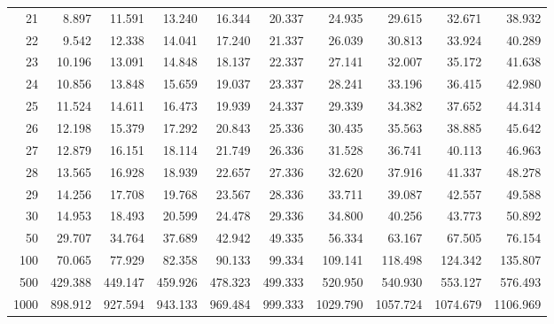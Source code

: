 \begin{minipage}{18cm}
\begin{center}
\begin{tabular}{|r|rrr|rrr|rrr|}
21&8.897&11.591&13.240&16.344&20.337&24.935&29.615&32.671&38.932\\
22&9.542&12.338&14.041&17.240&21.337&26.039&30.813&33.924&40.289\\
23&10.196&13.091&14.848&18.137&22.337&27.141&32.007&35.172&41.638\\
24&10.856&13.848&15.659&19.037&23.337&28.241&33.196&36.415&42.980\\
25&11.524&14.611&16.473&19.939&24.337&29.339&34.382&37.652&44.314\\
26&12.198&15.379&17.292&20.843&25.336&30.435&35.563&38.885&45.642\\
27&12.879&16.151&18.114&21.749&26.336&31.528&36.741&40.113&46.963\\
28&13.565&16.928&18.939&22.657&27.336&32.620&37.916&41.337&48.278\\
29&14.256&17.708&19.768&23.567&28.336&33.711&39.087&42.557&49.588\\
30&14.953&18.493&20.599&24.478&29.336&34.800&40.256&43.773&50.892\\
50&29.707&34.764&37.689&42.942&49.335&56.334&63.167&67.505&76.154\\
100&70.065&77.929&82.358&90.133&99.334&109.141&118.498&124.342&135.807\\
500&429.388&449.147&459.926&478.323&499.333&520.950&540.930&553.127&576.493\\
1000&898.912&927.594&943.133&969.484&999.333&1029.790&1057.724&1074.679&1106.969\\
\hline
\end{tabular}
\end{center}
    \end{minipage}


